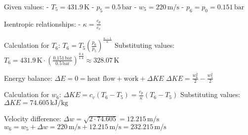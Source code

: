 Given values:  
- \( T_5 = 431.9 \, \text{K} \)  
- \( p_5 = 0.5 \, \text{bar} \)  
- \( w_5 = 220 \, \text{m/s} \)  
- \( p_6 = p_0 = 0.151 \, \text{bar} \)  

Isentropic relationships:  
- \( \kappa = \frac{c_p}{c_v} \)  

Calculation for \( T_6 \):  
\( T_6 = T_5 \left( \frac{p_6}{p_5} \right)^{\frac{\kappa - 1}{\kappa}} \)  
Substituting values:  
\( T_6 = 431.9 \, \text{K} \cdot \left( \frac{0.151 \, \text{bar}}{0.5 \, \text{bar}} \right)^{\frac{0.4}{1.4}} \approx 328.07 \, \text{K} \)  

Energy balance:  
\( \Delta E = 0 = \text{heat flow} + \text{work} + \Delta KE \)  
\( \Delta KE = \frac{w_6^2}{2} - \frac{w_5^2}{2} \)  

Calculation for \( w_6 \):  
\( \Delta KE = c_v (T_6 - T_5) = \frac{c_p}{\kappa} (T_6 - T_5) \)  
Substituting values:  
\( \Delta KE = 74.605 \, \text{kJ/kg} \)  

Velocity difference:  
\( \Delta w = \sqrt{2 \cdot 74.605} = 12.215 \, \text{m/s} \)  
\( w_6 = w_5 + \Delta w = 220 \, \text{m/s} + 12.215 \, \text{m/s} = 232.215 \, \text{m/s} \)